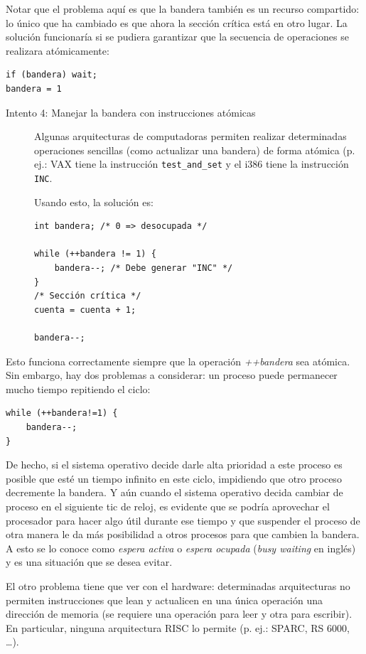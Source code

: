 \documentclass[11pt,fleqn]{book} %
\begin{document}
  Notar que el problema aquí es que la bandera también es un recurso
  compartido: lo único que ha cambiado es que ahora la sección crítica
  está en otro lugar. La solución funcionaría si se pudiera
  garantizar que la secuencia de operaciones se realizara atómicamente:


\begin{verbatim}
if (bandera) wait;
bandera = 1
\end{verbatim}

\begin{description}
\item[Intento 4: Manejar la bandera con instrucciones atómicas] Algunas arquitecturas de computadoras permiten realizar determinadas
  operaciones sencillas (como actualizar una bandera) de forma atómica
  (p. ej.: VAX tiene la instrucción \texttt{test\_and\_set} y el i386 tiene la
  instrucción \texttt{INC}.

  Usando esto, la solución es:


\begin{verbatim}
int bandera; /* 0 => desocupada */

while (++bandera != 1) {
    bandera--; /* Debe generar "INC" */
}
/* Sección crítica */
cuenta = cuenta + 1;

bandera--;
\end{verbatim}
\end{description}

  Esto funciona correctamente siempre que la operación \emph{++bandera} sea
  atómica.  Sin embargo, hay dos problemas a considerar: un proceso
  puede permanecer mucho tiempo repitiendo el ciclo:


\begin{verbatim}
while (++bandera!=1) {
    bandera--;
}
\end{verbatim}

  De hecho, si el sistema operativo decide darle alta prioridad a este
  proceso es posible que esté un tiempo infinito en este ciclo,
  impidiendo que otro proceso decremente la bandera. Y aún cuando el
  sistema operativo decida cambiar de proceso en el siguiente tic de
  reloj, es evidente que se podría aprovechar el procesador para hacer
  algo útil durante ese tiempo y que suspender el proceso de otra manera
  le da más posibilidad a otros procesos para que cambien la bandera. A
  esto se lo conoce como \emph{espera activa} o \emph{espera ocupada} (\emph{busy   waiting} en inglés) y es una situación que se desea evitar.

  El otro problema tiene que ver con el hardware: determinadas
  arquitecturas no permiten instrucciones que lean y actualicen en una
  única operación una dirección de memoria (se requiere una operación
  para leer y otra para escribir).  En particular, ninguna arquitectura
  RISC lo permite (p. ej.: SPARC, RS 6000, \ldots{}).
\end{document}
